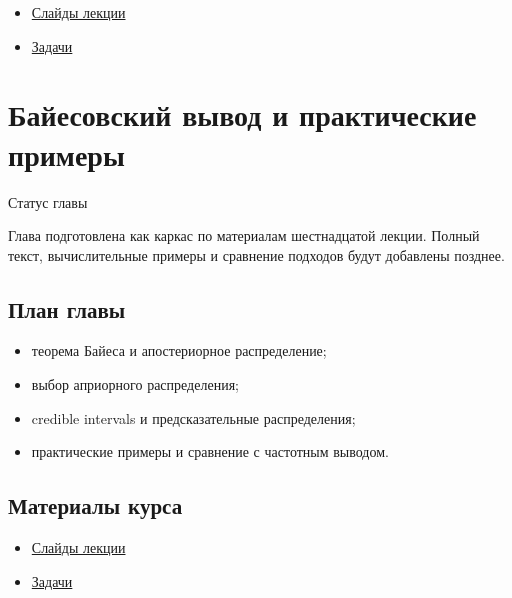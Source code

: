 \documentclass[
  russian,
  letterpaper,
]{scrbook}
\providecommand{\tightlist}{%
  \setlength{\itemsep}{0pt}\setlength{\parskip}{0pt}}
\begin{document}
\begin{itemize}
\tightlist
\item
  \href{https://neutrinohit.github.io/statistical-analysis-course/ru/slides/14_nuisance_parameters_and_systematics.html}{Слайды
  лекции}
\item
  \href{https://neutrinohit.github.io/statistical-analysis-course/ru/slides/exercises/14_nuisance_parameters_and_systematics_exercises.html}{Задачи}
\end{itemize}

\chapter{Байесовский вывод и практические
примеры}\label{ux431ux430ux439ux435ux441ux43eux432ux441ux43aux438ux439-ux432ux44bux432ux43eux434-ux438-ux43fux440ux430ux43aux442ux438ux447ux435ux441ux43aux438ux435-ux43fux440ux438ux43cux435ux440ux44b}

{Статус главы}

Глава подготовлена как каркас по материалам шестнадцатой лекции. Полный
текст, вычислительные примеры и сравнение подходов будут добавлены
позднее.

\section{План
главы}\label{ux43fux43bux430ux43d-ux433ux43bux430ux432ux44b-14}

\begin{itemize}
\tightlist
\item
  теорема Байеса и апостериорное распределение;
\item
  выбор априорного распределения;
\item
  credible intervals и предсказательные распределения;
\item
  практические примеры и сравнение с частотным выводом.
\end{itemize}

\section{Материалы
курса}\label{ux43cux430ux442ux435ux440ux438ux430ux43bux44b-ux43aux443ux440ux441ux430-13}

\begin{itemize}
\tightlist
\item
  \href{https://neutrinohit.github.io/statistical-analysis-course/ru/slides/15_bayesian_examples.html}{Слайды
  лекции}
\item
  \href{https://neutrinohit.github.io/statistical-analysis-course/ru/slides/exercises/15_bayesian_examples_exercises.html}{Задачи}
\end{itemize}


\backmatter
\end{document}
